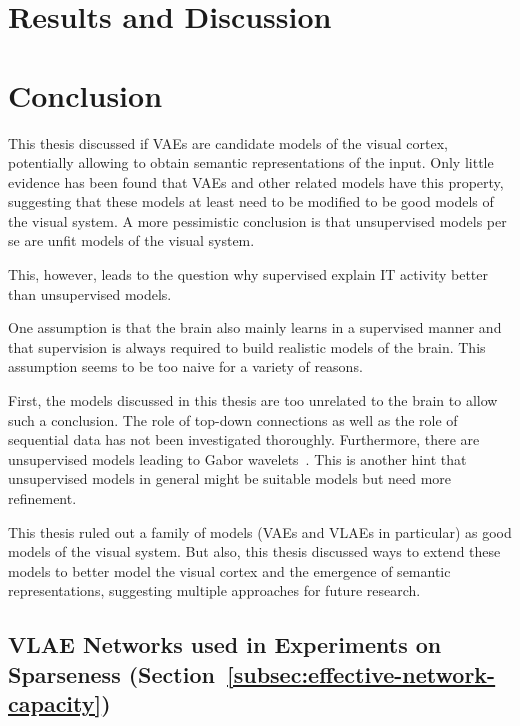 \documentclass[11pt,a4paper]{article}
\let\oldsection\section
\renewcommand\section{\clearpage\oldsection}
\newcounter{savepage}
\begin{document}
\section{Results and Discussion}\label{sec:results}


\acresetall
\section{Conclusion}\label{sec:conclusion}

This thesis discussed if \acfp{VAE} are candidate models of the visual cortex, potentially allowing to obtain semantic representations of the input.
Only little evidence has been found that \acp{VAE} and other related models have this property, suggesting that these models at least need to be modified to be good models of the visual system.
A more pessimistic conclusion is that unsupervised models per se are unfit models of the visual system.

This, however, leads to the question why supervised explain \ac{IT} activity better than unsupervised models.

One assumption is that the brain also mainly learns in a supervised manner and that supervision is always required to build realistic models of the brain.
This assumption seems to be too naive for a variety of reasons.

First, the models discussed in this thesis are too unrelated to the brain to allow such a conclusion.
The role of top-down connections as well as the role of sequential data has not been investigated thoroughly.
Furthermore, there are unsupervised models leading to Gabor wavelets~\citep{berkes2005slow}.
This is another hint that unsupervised models in general might be suitable models but need more refinement.

This thesis ruled out a family of models (\acp{VAE} and \acp{VLAE} in particular) as good models of the visual system.
But also, this thesis discussed ways to extend these models to better model the visual cortex and the emergence of semantic representations, suggesting multiple approaches for future research.

\newpage
\printbibliography

\newpage
{}
\setcounter{page}{\thesavepage}

\appendix


\begin{landscape}
\section{\ac{VLAE} Networks used in Experiments on Sparseness (Section~\ref{subsec:effective-network-capacity})}\label{sec:listings_sparsity_networks}

\pagebreak

\pagebreak

\pagebreak

\pagebreak

\pagebreak

\end{landscape}
\end{document}
